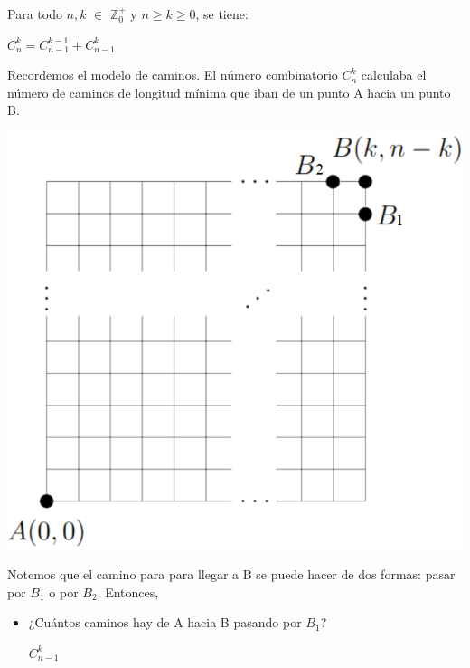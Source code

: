 \documentclass[12pt]{article}
\begin{document}
\begin{teorema}

    Para todo $n, k$ $\in$ $\mathbb{Z}^{+}_{0}$ y $n \geq k \geq 0$, se tiene:

    \begin{center}
        $C^{k}_{n} = C^{k-1}_{n-1} + C^{k}_{n-1}$
    \end{center}
\end{teorema}

\begin{demostracion}

    Recordemos el modelo de caminos. El número combinatorio $C^{k}_{n}$ calculaba  el  número de  caminos  de  longitud mínima  que  iban  de  un punto A hacia un punto B.

    \begin{center}
        \includegraphics[scale=0.6]{Imagenes/IMG5/Caminos6.png}
    \end{center}

    Notemos que el camino para para llegar a B se puede hacer de dos formas: pasar por $B_1$ o por $B_2$. Entonces, 

    \begin{itemize}
        \item ¿Cuántos caminos hay de A hacia B pasando por $B_1$?

        \begin{center}
            $C^{k}_{n-1}$
        \end{center}


\end{itemize}
\end{demostracion}
\end{document}
